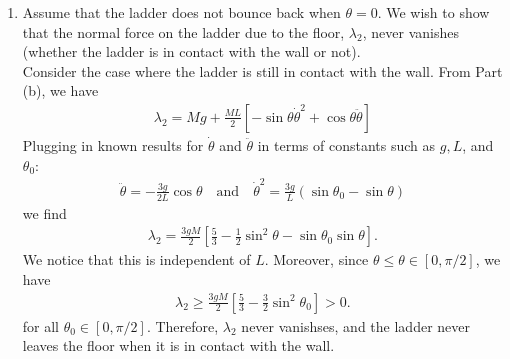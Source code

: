 \documentclass{article}
\theoremstyle{definition}
\newcommand{\f}[2]{\frac{#1}{#2}}
\newcommand{\lb}{\left[}
\newcommand{\rb}{\right]}
\begin{document}
\begin{enumerate}[label = (\alph*)]
		
		\item Assume that the ladder does not bounce back when $\theta = 0$. We wish to show that the normal force on the ladder due to the floor, $\lambda_2$, never vanishes (whether the ladder is in contact with the wall or not). \\
		
		Consider the case where the ladder is still in contact with the wall. From Part (b), we have
		\begin{align*}
		\lambda_2 = Mg + \f{ML}{2}\lb -\sin\theta \dot\theta^2 + \cos\theta \ddot\theta \rb
		\end{align*}
		Plugging in known results for $\dot\theta$ and $\ddot\theta$ in terms of constants such as $g,L$, and $\theta_0$:
		\begin{align*}
		\ddot\theta  = -\f{3g}{2L}\cos\theta \quad\text{and}\quad \dot\theta^2 = \f{3g}{L}(\sin\theta_0-\sin\theta)
		\end{align*}
		we find 
		\begin{align*}
		\lambda_2 = \f{3gM}{2}\lb \f{5}{3} - \f{1}{2}\sin^2\theta - \sin\theta_0 \sin\theta \rb.
		\end{align*}
		We notice that this is independent of $L$. Moreover, since $\theta \leq \theta \in [0,\pi/2]$, we have
		\begin{align*}
		\lambda_2 \geq \f{3gM}{2}\lb \f{5}{3} - \f{3}{2}\sin^2\theta_0 \rb > 0.
		\end{align*}
		for all $\theta_0 \in [0,\pi/2]$. Therefore, $\lambda_2$ never vanishses, and the ladder never leaves the floor when it is in contact with the wall. \\ 
		
		
		

\end{enumerate}
\end{document}
